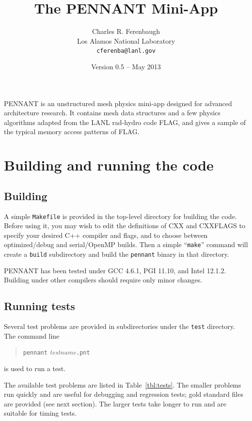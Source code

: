 \documentclass[11pt,letterpaper]{article} %
\begin{document}
\title{The PENNANT Mini-App}
\author{Charles R. Ferenbaugh \\
        Los Alamos National Laboratory \\
        {\tt cferenba@lanl.gov}}
\date{Version 0.5 -- May 2013}
\maketitle

PENNANT is an unstructured mesh physics mini-app designed for advanced
architecture research.
It contains mesh data structures and a few physics algorithms adapted
from the LANL rad-hydro code FLAG, and gives a
sample of the typical memory access patterns of FLAG.

\section{Building and running the code}

\subsection{Building}

A simple {\tt Makefile} is provided in the top-level directory for building
the code.  Before using it, you may wish to edit the definitions of CXX
and CXXFLAGS to specify your desired C++ compiler and flags, and to
choose between optimized/debug and serial/OpenMP builds.  Then
a simple ``{\tt make}'' command will create a {\tt build} subdirectory and
build the {\tt pennant} binary in that directory.

PENNANT has been tested under GCC 4.6.1, PGI 11.10, and Intel 12.1.2.
Building under other compilers should require only minor changes.

\subsection{Running tests}

Several test problems are provided in subdirectories under the {\tt test}
directory.  The command line
\begin{quote}
{\tt pennant} {\em testname}{\tt.pnt}
\end{quote}
is used to run a test.

The available test problems are listed in Table~\ref{tbl:tests}.
The smaller problems run quickly and are useful for debugging and
regression tests; gold standard files are provided (see next section).
The larger tests take longer to run and are suitable for timing tests.
\end{document}
